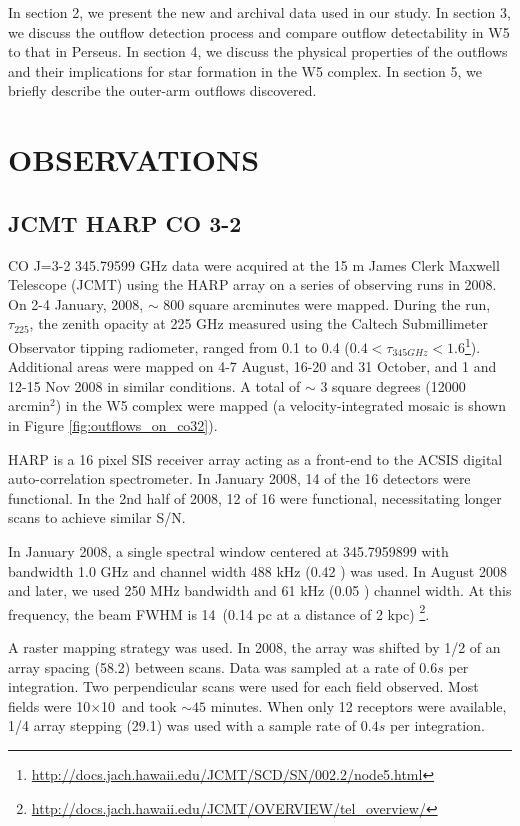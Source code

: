 \par
\par In section 2, we present the new and archival data used in our study.  In
section 3, we discuss the outflow detection process and compare outflow
detectability in W5 to that in Perseus.  In section 4, we discuss the physical
properties of the outflows and their implications for star formation in the W5
complex.  In section 5, we briefly describe the outer-arm outflows discovered.

\section{OBSERVATIONS}
\subsection{JCMT HARP CO 3-2}
CO J=3-2 345.79599 GHz data were acquired at the 15 m James Clerk Maxwell
Telescope (JCMT) using the HARP array on a series of observing runs in 2008.
On 2-4 January, 2008, $\sim$ 800 square arcminutes were mapped.  During the
run, $\tau_{225}$, the zenith opacity at 225 GHz measured using the Caltech
Submillimeter Observator tipping radiometer, ranged from 0.1 to 0.4
($0.4<\tau_{345
GHz}<1.6$\footnote{\url{http://docs.jach.hawaii.edu/JCMT/SCD/SN/002.2/node5.html}}).
Additional areas were mapped on 4-7 August, 16-20 and 31 October, and 1 and
12-15 Nov 2008 in similar conditions.  A total of $\sim$ 3 square degrees (12000
arcmin$^2$) in the W5 complex were mapped (a velocity-integrated mosaic is
shown in Figure \ref{fig:outflows_on_co32}).

HARP is a 16 pixel SIS receiver array acting as a front-end to the ACSIS
digital auto-correlation spectrometer.  In January 2008, 14 of the 16 detectors
were functional.  In the 2nd half of 2008, 12 of 16 were functional,
necessitating longer scans to achieve similar S/N.

In January 2008, a single spectral window centered at 345.7959899 with bandwidth 1.0
GHz and channel width 488 kHz (0.42 \kms) was used.  In August 2008 and later, we used 250 MHz
bandwidth and 61 kHz (0.05 \kms) channel width.  At this frequency, the beam
FWHM is 14\arcsec\ (0.14 pc at a distance of 2 kpc)
\footnote{\url{http://docs.jach.hawaii.edu/JCMT/OVERVIEW/tel_overview/}}.

A raster mapping strategy was used.  In 2008, the array was shifted by 1/2 of
an array spacing (58.2\arcsec) between scans.  Data was sampled at a rate of
$0.6 s$ per integration.  Two perpendicular scans were used for each field
observed.  Most fields were 10$\times$10\arcmin\ and took $\sim45$ minutes.
When only 12 receptors were available, 1/4 array stepping (29.1\arcsec) was
used with a sample rate of $0.4 s$ per integration.

